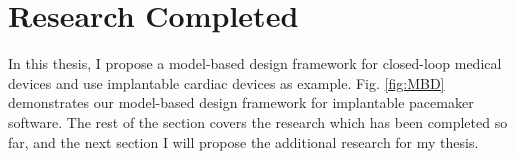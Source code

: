 \documentclass[a4paper]{article}
\begin{document}






\newpage
\section{Research Completed}
In this thesis, I propose a model-based design framework for closed-loop medical devices and use implantable cardiac devices as example.
Fig. \ref{fig:MBD} demonstrates our model-based design framework for implantable pacemaker software.
The rest of the section covers the research which has been completed so far, and the next section I will propose the additional research for my thesis.
\end{document}
